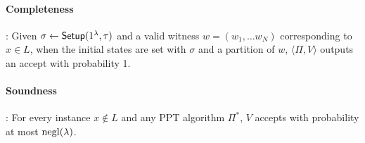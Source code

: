 \paragraph{Completeness}: %
Given $\sigma \gets \mathsf{Setup}(1^{\lambda}, \tau)$ and a valid witness $w = (w_1, \ldots w_N)$ corresponding to $x \in L$, when the initial states are set with $\sigma$ and a partition of $w$, $\langle \Pi, V \rangle$ outputs an accept with probability 1.

\paragraph{Soundness}:  For every instance $x \notin L$ and any PPT algorithm $\Pi^*$, $V$ accepts with probability at most $\mathrm{negl}({\lambda})$.

